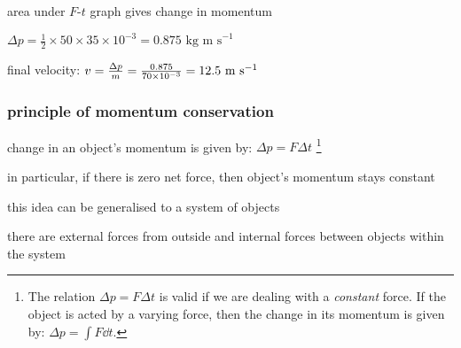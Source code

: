 
\sol area under $F$-$t$ graph gives change in momentum

{
	\centering
	
	$ \Delta p = \frac{1}{2} \times 50 \times 35\times10^{-3} = 0.875 \text{ kg m s}^{-1} $
	
}

final velocity: $v = \frac{\Delta p}{m} = \frac{0.875}{70\times10^{-3}} = 12.5 \text{ m s$^{-1}$} $ \eoe


%
%
%
%
%
%
%


\subsubsection{principle of momentum conservation}\label{ch:momentum-conservation}

change in an object's momentum is given by: $\Delta p = F \Delta t$
\footnote{The relation $\Delta p = F \Delta t$ is valid if we are dealing with a \emph{constant} force. If the object is acted by a varying force, then the change in its momentum is given by: $\Delta p = \int F \dd t$.}

in particular, if there is zero net force, then object's momentum stays constant


this idea can be generalised to a system of objects

there are external forces from outside and internal forces between objects within the system

